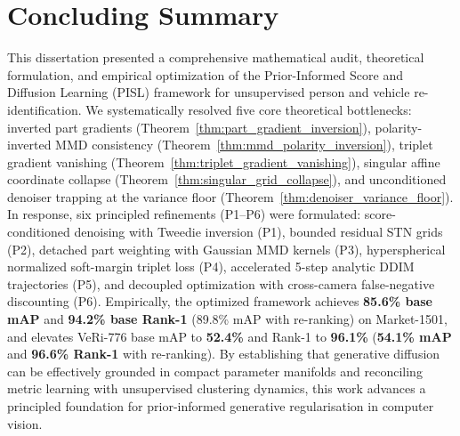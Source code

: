 \section{Concluding Summary}
\label{sec:conclusion}

This dissertation presented a comprehensive mathematical audit, theoretical formulation, and empirical optimization of the Prior-Informed Score and Diffusion Learning (PISL) framework for unsupervised person and vehicle re-identification. We systematically resolved five core theoretical bottlenecks: inverted part gradients (Theorem~\ref{thm:part_gradient_inversion}), polarity-inverted MMD consistency (Theorem~\ref{thm:mmd_polarity_inversion}), triplet gradient vanishing (Theorem~\ref{thm:triplet_gradient_vanishing}), singular affine coordinate collapse (Theorem~\ref{thm:singular_grid_collapse}), and unconditioned denoiser trapping at the variance floor (Theorem~\ref{thm:denoiser_variance_floor}). In response, six principled refinements (P1--P6) were formulated: score-conditioned denoising with Tweedie inversion (P1), bounded residual STN grids (P2), detached part weighting with Gaussian MMD kernels (P3), hyperspherical normalized soft-margin triplet loss (P4), accelerated 5-step analytic DDIM trajectories (P5), and decoupled optimization with cross-camera false-negative discounting (P6). Empirically, the optimized framework achieves \textbf{85.6\% base mAP} and \textbf{94.2\% base Rank-1} (89.8\% mAP with re-ranking) on Market-1501, and elevates VeRi-776 base mAP to \textbf{52.4\%} and Rank-1 to \textbf{96.1\%} (\textbf{54.1\% mAP} and \textbf{96.6\% Rank-1} with re-ranking). By establishing that generative diffusion can be effectively grounded in compact parameter manifolds and reconciling metric learning with unsupervised clustering dynamics, this work advances a principled foundation for prior-informed generative regularisation in computer vision.
